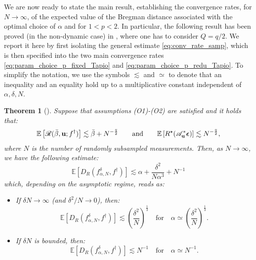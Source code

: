 \documentclass[11pt,a4paper]{article}
\numberwithin{equation}{section}
\newtheorem{theorem}{Theorem}[]
\newcommand{\msR}{\mathscr{R}}
\renewcommand{\vec}[1]{\boldsymbol{#1}} %
\newcommand{\bu}{{\bf u}}
\newcommand{\be}{{\vec{\epsilon}}}
\newcommand{\cAbu}{\mathscr{A}_{\bu}}
\newcommand{\E}{\mathbb{E}}
\def\fdan{f^\delta_{\alpha,N}}
\begin{document}
We are now ready to state the main result, establishing the convergence rates, for $N \rightarrow \infty$, of the expected value of the Bregman distance associated with the optimal choice of $\alpha$ and for $1<p<2$. 
In particular, the following result has been proved (in the non-dynamic case) in \cite[Theorem 4.10]{bubba2021}, where one has to consider $Q=q/2$. We report it here by first isolating the general estimate \eqref{eq:conv_rate_samp}, which is then specified into the two main convergence rates \eqref{eq:param_choice_p_fixed_Tapio} and \eqref{eq:param_choice_p_redu_Tapio}. To simplify the notation, we use the symbols $\lesssim$ and $\simeq$ to denote that an inequality and an equality hold up to a multiplicative constant independent of $\alpha, \delta, N$.
\begin{theorem}[{\cite[Theorem 4.10 with $Q=q/2$]{bubba2021}}]
\label{thm:general_rate}
Suppose that assumptions (O1)-(O2) are satisfied and it holds that:
\begin{equation}
\label{eq:ass_on_phomog_rate1}
\E \left[ \msR(\bar{\beta}, \bu; f^\dag) \right] \lesssim \bar{\beta} + N^{-\frac{q}{2}}
\qquad
\text{and}
\qquad
\E \left[R^\star(\cAbu^* \be)\right] \lesssim N^{-\frac q2},
\end{equation}
where $N$ is the number of randomly subsampled measurements. Then, as $N \rightarrow \infty$, we have the following estimate:
\begin{equation}
\E \left[D_R(\fdan, f^\dag) \right] \lesssim \alpha + \frac{\delta^2}{N \alpha^3} + N^{-1}
    \label{eq:conv_rate_samp}
\end{equation}
which, depending on the asymptotic regime, reads as:
\begin{itemize}
    \item If $\delta N \rightarrow \infty$ (and $\delta^2/N \rightarrow 0$), then:
    \begin{equation}
	\label{eq:param_choice_p_fixed_Tapio}
	\E \left[D_R(\fdan, f^\dag) \right] \lesssim  \left( \frac{\delta^2}{N}\right)^{\frac{1}{3}} \quad \text{for} \quad \alpha \simeq  \left( \frac{\delta^2}{N}\right)^{\frac{1}{3}}.
    \end{equation}
    \item If $\delta N$ is bounded, then: 
    \begin{equation}
	\label{eq:param_choice_p_redu_Tapio}
	\E \left[D_R(\fdan, f^\dag) \right] \lesssim  N^{-1} \quad \text{for} \quad \alpha \simeq N^{-1}. 
    \end{equation}
\end{itemize}
\end{theorem}
\end{document}
